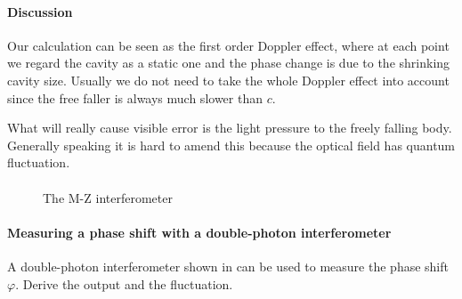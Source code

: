 \documentclass[hyperref, a4paper]{article}
\begin{document}
\paragraph{Discussion} Our calculation can be seen as the first order Doppler effect, 
where at each point we regard the cavity as a static one and the phase change is due to the shrinking cavity size.
Usually we do not need to take the whole Doppler effect into account since the free faller is always much slower than $c$.

What will really cause visible error is the light pressure to the freely falling body.
Generally speaking it is hard to amend this because the optical field has quantum fluctuation.

\paragraph{}

\begin{figure}
    
    \caption{The M-Z interferometer}
    \label{fig:mz-interferometer}    
\end{figure}

\paragraph{Measuring a phase shift with a double-photon interferometer} A double-photon interferometer shown in  can be used to measure the phase shift $\varphi$.
Derive the output and the fluctuation.
\end{document}
